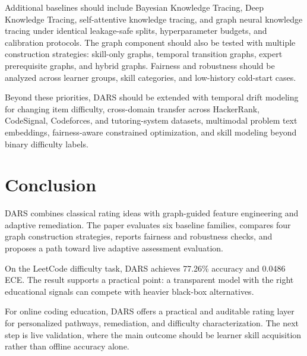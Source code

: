 \documentclass[conference]{IEEEtran}
\begin{document}
Additional baselines should include Bayesian Knowledge Tracing, Deep Knowledge Tracing, self-attentive knowledge tracing, and graph neural knowledge tracing under identical leakage-safe splits, hyperparameter budgets, and calibration protocols. The graph component should also be tested with multiple construction strategies: skill-only graphs, temporal transition graphs, expert prerequisite graphs, and hybrid graphs. Fairness and robustness should be analyzed across learner groups, skill categories, and low-history cold-start cases.

Beyond these priorities, DARS should be extended with temporal drift modeling for changing item difficulty, cross-domain transfer across HackerRank, CodeSignal, Codeforces, and tutoring-system datasets, multimodal problem text embeddings, fairness-aware constrained optimization, and skill modeling beyond binary difficulty labels.

\section{Conclusion}

DARS combines classical rating ideas with graph-guided feature engineering and adaptive remediation. The paper evaluates six baseline families, compares four graph construction strategies, reports fairness and robustness checks, and proposes a path toward live adaptive assessment evaluation.

On the LeetCode difficulty task, DARS achieves 77.26\% accuracy and 0.0486 ECE. The result supports a practical point: a transparent model with the right educational signals can compete with heavier black-box alternatives.

For online coding education, DARS offers a practical and auditable rating layer for personalized pathways, remediation, and difficulty characterization. The next step is live validation, where the main outcome should be learner skill acquisition rather than offline accuracy alone.
\end{document}
